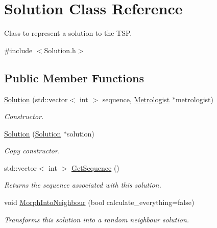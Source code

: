 \hypertarget{classSolution}{}\section{Solution Class Reference}
\label{classSolution}


Class to represent a solution to the T\+SP.  




{\ttfamily \#include $<$Solution.\+h$>$}

\subsection*{Public Member Functions}
\begin{DoxyCompactItemize}
\item 
\hyperlink{classSolution_a4a34a6366e3eedfba8e4e05d6385e0b7}{Solution} (std\+::vector$<$ int $>$ sequence, \hyperlink{classMetrologist}{Metrologist} $\ast$metrologist)
\begin{DoxyCompactList}\small\item\em Constructor. \end{DoxyCompactList}\item 
\hyperlink{classSolution_adb1a72acc2b2dd9556574a249f10e6cc}{Solution} (\hyperlink{classSolution}{Solution} $\ast$solution)
\begin{DoxyCompactList}\small\item\em Copy constructor. \end{DoxyCompactList}\item 
\mbox{\label{classSolution_a76ce1e0bf62dc665571fe45274cd5ca9}} 
std\+::vector$<$ int $>$ \hyperlink{classSolution_a76ce1e0bf62dc665571fe45274cd5ca9}{Get\+Sequence} ()
\begin{DoxyCompactList}\small\item\em Returns the sequence associated with this solution. \end{DoxyCompactList}\item 
void \hyperlink{classSolution_a5ee367863638e53c2e17222ac3f347d7}{Morph\+Into\+Neighbour} (bool calculate\+\_\+everything=false)
\begin{DoxyCompactList}\small\item\em Transforms this solution into a random neighbour solution. \end{DoxyCompactList}\item 
\mbox{\label{classSolution_a8fe3521e7356329fb01e36411815d370}} 

\end{DoxyCompactItemize}
